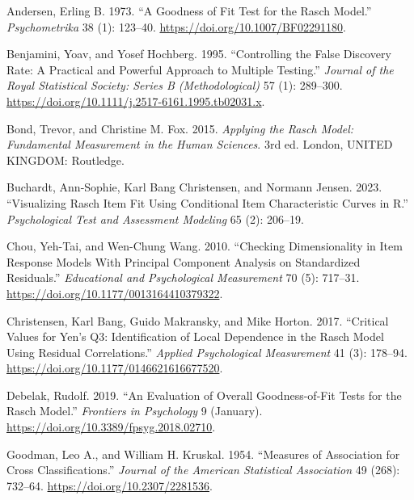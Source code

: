 \documentclass[
  letterpaper,
  DIV=11,
  numbers=noendperiod]{scrartcl}
\newlength{\cslhangindent}
\newenvironment{CSLReferences}[2] %
 {\begin{list}{}{%
  \setlength{\itemindent}{0pt}
  \setlength{\leftmargin}{0pt}
  \setlength{\parsep}{0pt}
  \ifodd #1
   \setlength{\leftmargin}{\cslhangindent}
   \setlength{\itemindent}{-1\cslhangindent}
  \fi
  \setlength{\itemsep}{#2\baselineskip}}}
 {\end{list}}
\begin{document}
\label{refs}
\begin{CSLReferences}{1}{0}
Andersen, Erling B. 1973. {``A Goodness of Fit Test for the Rasch
Model.''} \emph{Psychometrika} 38 (1): 123--40.
\url{https://doi.org/10.1007/BF02291180}.

Benjamini, Yoav, and Yosef Hochberg. 1995. {``Controlling the {False}
{Discovery} {Rate}: {A} {Practical} and {Powerful} {Approach} to
{Multiple} {Testing}.''} \emph{Journal of the Royal Statistical Society:
Series B (Methodological)} 57 (1): 289--300.
\url{https://doi.org/10.1111/j.2517-6161.1995.tb02031.x}.

Bond, Trevor, and Christine M. Fox. 2015. \emph{Applying the {Rasch}
{Model}: {Fundamental} {Measurement} in the {Human} {Sciences}}. 3rd ed.
London, UNITED KINGDOM: Routledge.

Buchardt, Ann-Sophie, Karl Bang Christensen, and Normann Jensen. 2023.
{``Visualizing {Rasch} Item Fit Using Conditional Item Characteristic
Curves in {R}.''} \emph{Psychological Test and Assessment Modeling} 65
(2): 206--19.

Chou, Yeh-Tai, and Wen-Chung Wang. 2010. {``Checking {Dimensionality} in
{Item} {Response} {Models} {With} {Principal} {Component} {Analysis} on
{Standardized} {Residuals}.''} \emph{Educational and Psychological
Measurement} 70 (5): 717--31.
\url{https://doi.org/10.1177/0013164410379322}.

Christensen, Karl Bang, Guido Makransky, and Mike Horton. 2017.
{``Critical {Values} for {Yen}'s {Q3}: {Identification} of {Local}
{Dependence} in the {Rasch} {Model} {Using} {Residual}
{Correlations}.''} \emph{Applied Psychological Measurement} 41 (3):
178--94. \url{https://doi.org/10.1177/0146621616677520}.

Debelak, Rudolf. 2019. {``An {Evaluation} of {Overall}
{Goodness}-of-{Fit} {Tests} for the {Rasch} {Model}.''} \emph{Frontiers
in Psychology} 9 (January).
\url{https://doi.org/10.3389/fpsyg.2018.02710}.

Goodman, Leo A., and William H. Kruskal. 1954. {``Measures of
{Association} for {Cross} {Classifications}.''} \emph{Journal of the
American Statistical Association} 49 (268): 732--64.
\url{https://doi.org/10.2307/2281536}.


\end{CSLReferences}
\end{document}
